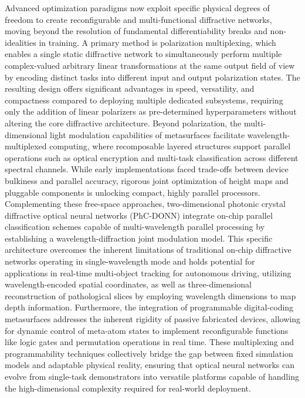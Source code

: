 \documentclass[11pt]{article}
\begin{document}
Advanced optimization paradigms now exploit specific physical degrees of freedom to create reconfigurable and multi-functional diffractive networks, moving beyond the resolution of fundamental differentiability breaks and non-idealities in training. A primary method is polarization multiplexing, which enables a single static diffractive network to simultaneously perform multiple complex-valued arbitrary linear transformations at the same output field of view by encoding distinct tasks into different input and output polarization states. The resulting design offers significant advantages in speed, versatility, and compactness compared to deploying multiple dedicated subsystems, requiring only the addition of linear polarizers as pre-determined hyperparameters without altering the core diffractive architecture. Beyond polarization, the multi-dimensional light modulation capabilities of metasurfaces facilitate wavelength-multiplexed computing, where recomposable layered structures support parallel operations such as optical encryption and multi-task classification across different spectral channels. While early implementations faced trade-offs between device bulkiness and parallel accuracy, rigorous joint optimization of height maps and pluggable components is unlocking compact, highly parallel processors. Complementing these free-space approaches, two-dimensional photonic crystal diffractive optical neural networks (PhC-DONN) integrate on-chip parallel classification schemes capable of multi-wavelength parallel processing by establishing a wavelength-diffraction joint modulation model. This specific architecture overcomes the inherent limitations of traditional on-chip diffractive networks operating in single-wavelength mode and holds potential for applications in real-time multi-object tracking for autonomous driving, utilizing wavelength-encoded spatial coordinates, as well as three-dimensional reconstruction of pathological slices by employing wavelength dimensions to map depth information. Furthermore, the integration of programmable digital-coding metasurfaces addresses the inherent rigidity of passive fabricated devices, allowing for dynamic control of meta-atom states to implement reconfigurable functions like logic gates and permutation operations in real time. These multiplexing and programmability techniques collectively bridge the gap between fixed simulation models and adaptable physical reality, ensuring that optical neural networks can evolve from single-task demonstrators into versatile platforms capable of handling the high-dimensional complexity required for real-world deployment. \citep{doi_10_1038_s41377_022_00849_x_e31226af} \citep{doi_10_1515_nanoph_2024_0483_f81cb7ab} \citep{doi_10_1038_s41928_022_00719_9_a2169947} \citep{doi_10_1515_nanoph_2025_0168_86a0f7aa}
\end{document}
